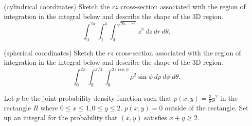 \documentclass[12pt,letterpaper,noanswers]{exam}
\begin{document}
 \pdfpageheight 11in 
  \pdfpagewidth 8.5in



\begin{questions}
\item (cylindrical coordinates) Sketch the $rz$ cross-section associated with the region of integration in the integral below and describe the shape of the 3D region.
\[\int_0^{2\pi}\int_1^5\int_0^{\sqrt{25-r^2}} z^2\ dz\ dr\ d\theta.\]

\vfill

\item (spherical coordinates) Sketch the $rz$ cross-section associated with the region of integration in the integral below and describe the shape of the 3D region.
\[\int_0^{2\pi}\int_0^{\pi/4}\int_0^{2/\cos\phi} \rho^2\sin\phi\ d\rho\ d\phi\ d\theta.\]

\vfill

\item Let $p$ be the joint probability density function such that $p(x,y) = \frac{3}{8}y^2$ in the rectangle $R$ where $0\leq x \leq 1, 0\leq y\leq 2$.  $p(x,y) =0$ outside of the rectangle.  Set up an integral for the probability that $(x,y)$ satisfies $x+y \geq 2$.

\vfill

\end{questions}
\end{document}
